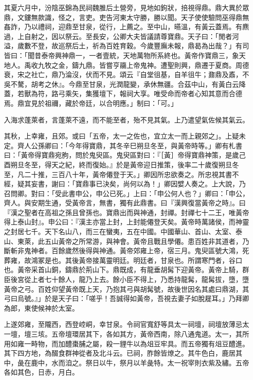 \begin{pinyinscope}
其夏六月中，汾陰巫錦為民祠魏脽后土營旁，見地如鉤狀，掊視得鼎。鼎大異於眾鼎，文鏤無款識，怪之，言吏。吏告河東太守勝，勝以聞。天子使使驗問巫得鼎無姦詐，乃以禮祠，迎鼎至甘泉，從行，上薦之。至中山，曣溫，有黃云蓋焉。有麃過，上自射之，因以祭云。至長安，公卿大夫皆議請尊寶鼎。天子曰：「閒者河溢，歲數不登，故巡祭后土，祈為百姓育穀。今歲豐廡未報，鼎曷為出哉？」有司皆曰：「聞昔泰帝興神鼎一，一者壹統，天地萬物所系終也。黃帝作寶鼎三，象天地人。禹收九牧之金，鑄九鼎。皆嘗亨鬺上帝鬼神。遭聖則興，鼎遷于夏商。周德衰，宋之社亡，鼎乃淪沒，伏而不見。頌云『自堂徂基，自羊徂牛；鼐鼎及鼒，不吳不驁，胡考之休』。今鼎至甘泉，光潤龍變，承休無疆。合茲中山，有黃白云降蓋，若獸為符，路弓乘矢，集獲壇下，報祠大享。唯受命而帝者心知其意而合德焉。鼎宜見於祖禰，藏於帝廷，以合明應。」制曰：「可。」

入海求蓬萊者，言蓬萊不遠，而不能至者，殆不見其氣。上乃遣望氣佐候其氣云。

其秋，上幸雍，且郊。或曰「五帝，太一之佐也，宜立太一而上親郊之」。上疑未定。齊人公孫卿曰：「今年得寶鼎，其冬辛巳朔旦冬至，與黃帝時等。」卿有札書曰：「黃帝得寶鼎宛朐，問於鬼臾區。鬼臾區對曰：『［黃］帝得寶鼎神策，是歲己酉朔旦冬至，得天之紀，終而復始。』於是黃帝迎日推策，後率二十歲復朔旦冬至，凡二十推，三百八十年，黃帝僊登于天。」卿因所忠欲奏之。所忠視其書不經，疑其妄書，謝曰：「寶鼎事已決矣，尚何以為！」卿因嬖人奏之。上大說，乃召問卿。對曰：「受此書申公，申公已死。」上曰：「申公何人也？」卿曰：「申公，齊人。與安期生通，受黃帝言，無書，獨有此鼎書。曰『漢興復當黃帝之時』。曰『漢之聖者在高祖之孫且曾孫也。寶鼎出而與神通，封禪。封禪七十二王，唯黃帝得上泰山封』。申公曰：『漢主亦當上封，上封能僊登天矣。黃帝時萬諸侯，而神靈之封居七千。天下名山八，而三在蠻夷，五在中國。中國華山、首山、太室、泰山、東萊，此五山黃帝之所常游，與神會。黃帝且戰且學僊。患百姓非其道者，乃斷斬非鬼神者。百餘歲然後得與神通。黃帝郊雍上帝，宿三月。鬼臾區號大鴻，死葬雍，故鴻冢是也。其後黃帝接萬靈明廷。明廷者，甘泉也。所謂寒門者，谷口也。黃帝采首山銅，鑄鼎於荊山下。鼎既成，有龍垂胡髯下迎黃帝。黃帝上騎，群臣後宮從上者七十餘人，龍乃上去。餘小臣不得上，乃悉持龍髯，龍髯拔，墮，墮黃帝之弓。百姓仰望黃帝既上天，乃抱其弓與胡髯號，故後世因名其處曰鼎湖，其弓曰烏號。』」於是天子曰：「嗟乎！吾誠得如黃帝，吾視去妻子如脫屣耳。」乃拜卿為郎，東使候神於太室。

上遂郊雍，至隴西，西登崆峒，幸甘泉。令祠官寬舒等具太一祠壇，祠壇放薄忌太一壇，壇三垓。五帝壇環居其下，各如其方，黃帝西南，除八通鬼道。太一，其所用如雍一畤物，而加醴棗脯之屬，殺一貍牛以為俎豆牢具。而五帝獨有俎豆醴進。其下四方地，為醊食群神從者及北斗云。已祠，胙餘皆燎之。其牛色白，鹿居其中，彘在鹿中，水而洎之。祭日以牛，祭月以羊彘特。太一祝宰則衣紫及繡。五帝各如其色，日赤，月白。


\end{pinyinscope}
